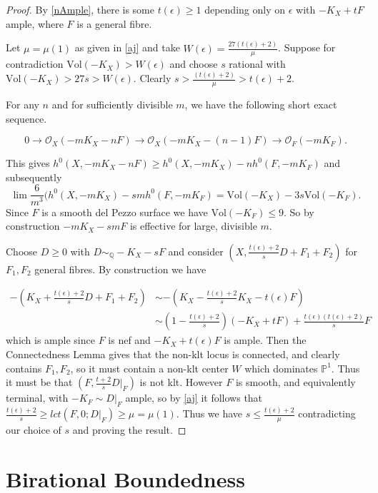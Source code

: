 \documentclass[a4paper,12pt]{book}
\newcommand{\Vol}{\text{Vol}}
\newcommand{\ox}{\mathcal{O}_{X}}
\begin{document}
\begin{proof}
	By \autoref{nAmple}, there is some $t(\epsilon)\geq 1$ depending only on $\epsilon$ with $-K_{X}+tF$ ample, where $F$ is a general fibre.
	
	Let $\mu=\mu(1)$ as given in \autoref{aj} and take $W(\epsilon)= \frac{27(t(\epsilon)+2)}{\mu}$. Suppose for contradiction $\Vol(-K_{X}) > W(\epsilon)$ and choose $s$ rational with $\Vol(-K_{X}) > 27s > W(\epsilon)$. Clearly $s > \frac{(t(\epsilon)+2)}{\mu} > t(\epsilon)+2$. 
	
	For any $n$ and for sufficiently divisible $m$, we have the following short exact sequence.
	
	\[0 \to \ox (-mK_{X}-nF) \to \ox(-mK_{X}-(n-1)F) \to \mathcal{O}_{F}(-mK_{F}).\]
	
	This gives $h^{0}(X,-mK_{X}-nF) \geq h^{0}(X,-mK_{X})-nh^{0}(F,-mK_{F})$ and subsequently 
	\[\lim \frac{6}{m^{3}}(h^{0}(X,-mK_{X})-smh^{0}(F,-mK_{F})= \Vol(-K_{X})-3s\Vol(-K_{F}).\] Since $F$ is a smooth del Pezzo surface we have $\Vol(-K_{F})\leq 9$.  So by construction $-mK_{X}-smF$ is effective for large, divisible $m$. 
	
	Choose $D\geq 0$ with $D \sim_{\mathbb{Q}} -K_{X}-sF$ and consider $(X,\frac{t(\epsilon)+2}{s}D+F_{1}+F_{2})$ for $F_{1},F_{2}$ general fibres. By construction we have
	
	\begin{align*}
	-(K_{X}+\frac{t(\epsilon)+2}{s}D+F_{1}+F_{2})&\sim -(K_{X}-\frac{t(\epsilon)+2}{s}K_{X}-t(\epsilon)F)\\
	&\sim (1-\frac{t(\epsilon)+2}{s})(-K_{X}+tF) + \frac{t(\epsilon)(t(\epsilon)+2)}{s}F
	\end{align*}
	which is ample since $F$ is nef and $-K_{X}+t(\epsilon)F$ is ample.
	Then the Connectedness Lemma gives that the non-klt locus is connected, and clearly contains $F_{1},F_{2}$, so it must contain a non-klt center $W$ which dominates $\mathbb{P}^{1}$. Thus it must be that $(F,\frac{t+2}{s}D|_{F})$ is not klt. However $F$ is smooth, and equivalently terminal, with $-K_{F}\sim D|_{F}$ ample, so by \autoref{aj} it follows that $\frac{t(\epsilon)+2}{s} \geq lct(F,0;D|_{F}) \geq \mu=\mu(1)$. Thus we have $s \leq \frac{t(\epsilon)+2}{\mu}$ contradicting our choice of $s$ and proving the result.
\end{proof}


\section{Birational Boundedness}
\end{document}
